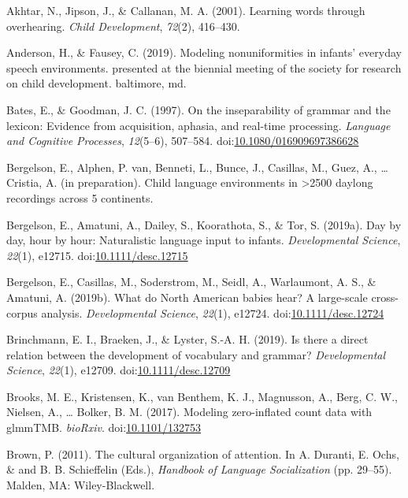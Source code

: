 \documentclass[,man,floatsintext]{apa6}
\begin{document}
\hypertarget{ref-akhtar2001learning}{}
Akhtar, N., Jipson, J., \& Callanan, M. A. (2001). Learning words
through overhearing. \emph{Child Development}, \emph{72}(2), 416--430.

\hypertarget{ref-anderson2019modeling}{}
Anderson, H., \& Fausey, C. (2019). Modeling nonuniformities in infants'
everyday speech environments. presented at the biennial meeting of the
society for research on child development. baltimore, md.

\hypertarget{ref-bates1997inseparability}{}
Bates, E., \& Goodman, J. C. (1997). On the inseparability of grammar
and the lexicon: Evidence from acquisition, aphasia, and real-time
processing. \emph{Language and Cognitive Processes}, \emph{12}(5--6),
507--584.
doi:\href{https://doi.org/10.1080/016909697386628}{10.1080/016909697386628}

\hypertarget{ref-bergelsonIPbsl}{}
Bergelson, E., Alphen, P. van, Benneti, L., Bunce, J., Casillas, M.,
Guez, A., \ldots{} Cristia, A. (in preparation). Child language
environments in \textgreater{}2500 daylong recordings across 5
continents.

\hypertarget{ref-bergelson2019day}{}
Bergelson, E., Amatuni, A., Dailey, S., Koorathota, S., \& Tor, S.
(2019a). Day by day, hour by hour: Naturalistic language input to
infants. \emph{Developmental Science}, \emph{22}(1), e12715.
doi:\href{https://doi.org/10.1111/desc.12715}{10.1111/desc.12715}

\hypertarget{ref-bergelsoncasillas2019what}{}
Bergelson, E., Casillas, M., Soderstrom, M., Seidl, A., Warlaumont, A.
S., \& Amatuni, A. (2019b). What do North American babies hear? A
large-scale cross-corpus analysis. \emph{Developmental Science},
\emph{22}(1), e12724.
doi:\href{https://doi.org/10.1111/desc.12724}{10.1111/desc.12724}

\hypertarget{ref-brinchmann2019direct}{}
Brinchmann, E. I., Braeken, J., \& Lyster, S.-A. H. (2019). Is there a
direct relation between the development of vocabulary and grammar?
\emph{Developmental Science}, \emph{22}(1), e12709.
doi:\href{https://doi.org/10.1111/desc.12709}{10.1111/desc.12709}

\hypertarget{ref-brooks2017modeling}{}
Brooks, M. E., Kristensen, K., van Benthem, K. J., Magnusson, A., Berg,
C. W., Nielsen, A., \ldots{} Bolker, B. M. (2017). Modeling
zero-inflated count data with glmmTMB. \emph{bioRxiv}.
doi:\href{https://doi.org/10.1101/132753}{10.1101/132753}

\hypertarget{ref-brown2011cultural}{}
Brown, P. (2011). The cultural organization of attention. In A. Duranti,
E. Ochs, \& and B. B. Schieffelin (Eds.), \emph{Handbook of Language
Socialization} (pp. 29--55). Malden, MA: Wiley-Blackwell.
\end{document}
